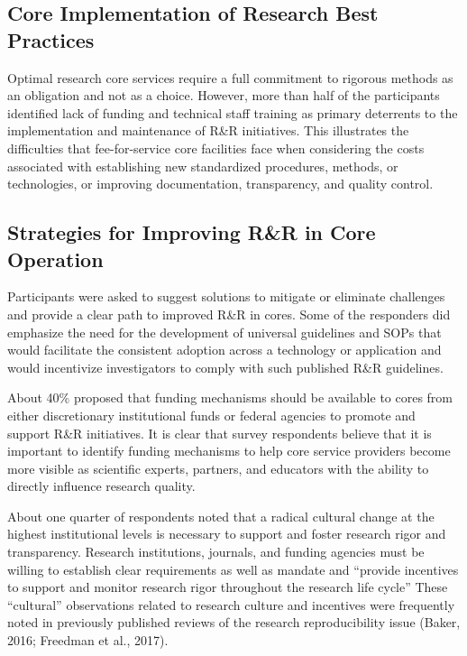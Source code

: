 \documentclass[]{article}
\begin{document}
\subsection{Core Implementation of Research Best
Practices}\label{core-implementation-of-research-best-practices}

Optimal research core services require a full commitment to rigorous
methods as an obligation and not as a choice. However, more than half of
the participants identified lack of funding and technical staff training
as primary deterrents to the implementation and maintenance of R\&R
initiatives. This illustrates the difficulties that fee-for-service core
facilities face when considering the costs associated with establishing
new standardized procedures, methods, or technologies, or improving
documentation, transparency, and quality control.

\subsection{Strategies for Improving R\&R in Core
Operation}\label{strategies-for-improving-rr-in-core-operation}

Participants were asked to suggest solutions to mitigate or eliminate
challenges and provide a clear path to improved R\&R in cores. Some of
the responders did emphasize the need for the development of universal
guidelines and SOPs that would facilitate the consistent adoption across
a technology or application and would incentivize investigators to
comply with such published R\&R guidelines.

About 40\% proposed that funding mechanisms should be available to cores
from either discretionary institutional funds or federal agencies to
promote and support R\&R initiatives. It is clear that survey
respondents believe that it is important to identify funding mechanisms
to help core service providers become more visible as scientific
experts, partners, and educators with the ability to directly influence
research quality.

About one quarter of respondents noted that a radical cultural change at
the highest institutional levels is necessary to support and foster
research rigor and transparency. Research institutions, journals, and
funding agencies must be willing to establish clear requirements as well
as mandate and ``provide incentives to support and monitor research
rigor throughout the research life cycle'' These ``cultural''
observations related to research culture and incentives were frequently
noted in previously published reviews of the research reproducibility
issue (Baker, 2016; Freedman et al., 2017).
\end{document}
